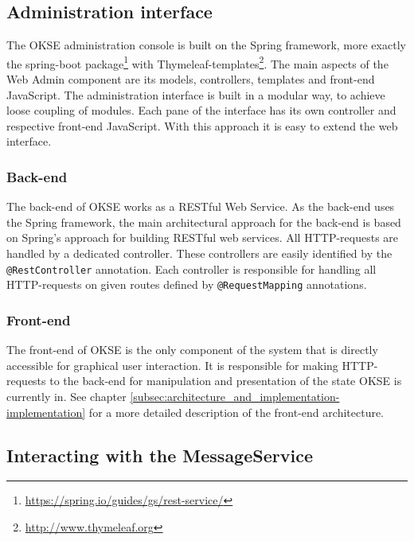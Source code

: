 \subsection{Administration interface}
\label{subsec:administration_interface}

The OKSE administration console is built on the Spring framework, more exactly the spring-boot package\footnote{\url{https://spring.io/guides/gs/rest-service/}} with Thymeleaf-templates\footnote{\url{http://www.thymeleaf.org}}. The main aspects of the Web Admin component are its models, controllers, templates and front-end JavaScript. The administration interface is built in a modular way, to achieve loose coupling of modules. Each pane of the interface has its own controller and respective front-end JavaScript.  With this approach it is easy to extend the web interface.

\subsubsection{Back-end}

The back-end of OKSE works as a RESTful Web Service. As the back-end uses the Spring framework, the main architectural approach for the back-end is based on Spring’s approach for building RESTful web services. All HTTP-requests are handled by a dedicated controller. These controllers are easily identified by the \verb!@RestController! annotation. Each controller is responsible for handling all HTTP-requests on given routes defined by \verb!@RequestMapping! annotations. 

\subsubsection{Front-end}

The front-end of OKSE is the only component of the system that is directly accessible for graphical user interaction. It is responsible for making HTTP-requests to the back-end for manipulation and presentation of the state OKSE is currently in. See chapter \ref{subsec:architecture_and_implementation-implementation} for a more detailed description of the front-end architecture.

\subsection{Interacting with the MessageService}
\label{subsec:components-interacting_with_the_messageservice}


